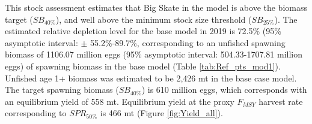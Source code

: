 \documentclass[12pt,]{article}
\begin{document}
This stock assessment estimates that Big Skate in the model is above the
biomass target (\(SB_{40\%}\)), and well above the minimum stock size
threshold (\(SB_{25\%}\)). The estimated relative depletion level for
the base model in 2019 is 72.5\% (95\% asymptotic interval: \(\pm\)
55.2\%-89.7\%, corresponding to an unfished spawning biomass of 1106.07
million eggs (95\% asymptotic interval: 504.33-1707.81 million eggs) of
spawning biomass in the base model (Table \ref{tab:Ref_pts_mod1}).
Unfished age 1+ biomass was estimated to be 2,426 mt in the base case
model. The target spawning biomass (\(SB_{40\%}\)) is 610 million eggs,
which corresponds with an equilibrium yield of 558 mt. Equilibrium yield
at the proxy \(F_{MSY}\) harvest rate corresponding to \(SPR_{50\%}\) is
466 mt (Figure \ref{fig:Yield_all}).

\FloatBarrier
\end{document}
